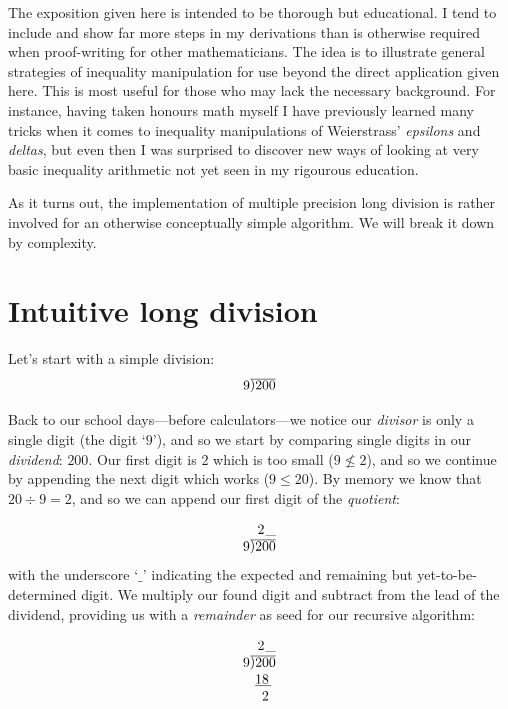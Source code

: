 \documentclass[twoside]{article}
\newcommand{\ldiv}[1]{\ensuremath{\raisebox{0.045em}{)}\hspace{-0.3275em}\overline{\ #1}}}
\begin{document}
The exposition given here is intended to be thorough but educational. I tend to include and show far more steps in my derivations
than is otherwise required when proof-writing for other mathematicians. The idea is to illustrate general strategies of inequality
manipulation for use beyond the direct application given here. This is most useful for those who may lack the necessary background.
For instance, having taken honours math myself I have previously learned many tricks when it comes to inequality manipulations of
Weierstrass' \emph{epsilons} and \emph{deltas}, but even then I was surprised to discover new ways of looking at very basic inequality
arithmetic not yet seen in my rigourous education.

As it turns out, the implementation of multiple precision long division is rather involved for an otherwise conceptually simple
algorithm. We will break it down by complexity.

\section*{Intuitive long division}

Let's start with a simple division:
$$ 9\ldiv{200} $$

Back to our school days---before calculators---we notice our \emph{divisor} is only a single digit (the digit `$ 9 $'),
and so we start by comparing single digits in our \emph{dividend}: $ 200 $. Our first digit is $ 2 $ which is too small
($ 9\not\le 2 $), and so we continue by appending the next digit which works ($ 9\le 20 $). By memory we know that
$ 20\div 9 = 2 $, and so we can append our first digit of the \emph{quotient}:

$$ \begin{array}{rr}
2\hspace{0.075em}\_	\\
9\ldiv{200}		\\
\end{array} $$
with the underscore `$ \_ $' indicating the expected and remaining but yet-to-be-determined digit. We multiply our found
digit and subtract from the lead of the dividend, providing us with a \emph{remainder} as seed for our recursive algorithm:

$$ \begin{array}{rr}
2\hspace{0.075em}\_		\\
9\ldiv{200}			\\
\underline{18\hspace{0.175em}}\	\\
2\hspace{0.175em}\ 
\end{array} $$
\end{document}

